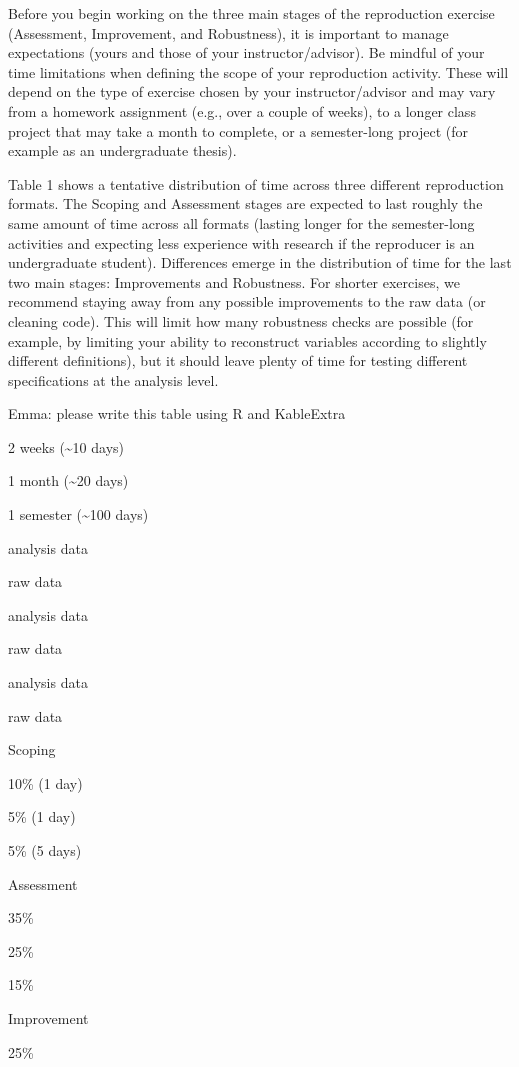 \documentclass[]{book}
\begin{document}
Before you begin working on the three main stages of the reproduction exercise (Assessment, Improvement, and Robustness), it is important to manage expectations (yours and those of your instructor/advisor). Be mindful of your time limitations when defining the scope of your reproduction activity. These will depend on the type of exercise chosen by your instructor/advisor and may vary from a homework assignment (e.g., over a couple of weeks), to a longer class project that may take a month to complete, or a semester-long project (for example as an undergraduate thesis).

Table 1 shows a tentative distribution of time across three different reproduction formats. The Scoping and Assessment stages are expected to last roughly the same amount of time across all formats (lasting longer for the semester-long activities and expecting less experience with research if the reproducer is an undergraduate student). Differences emerge in the distribution of time for the last two main stages: Improvements and Robustness. For shorter exercises, we recommend staying away from any possible improvements to the raw data (or cleaning code). This will limit how many robustness checks are possible (for example, by limiting your ability to reconstruct variables according to slightly different definitions), but it should leave plenty of time for testing different specifications at the analysis level.

Emma: please write this table using R and KableExtra

2 weeks (\textasciitilde{}10 days)

1 month (\textasciitilde{}20 days)

1 semester (\textasciitilde{}100 days)

analysis data

raw data

analysis data

raw data

analysis data

raw data

Scoping

10\% (1 day)

5\% (1 day)

5\% (5 days)

Assessment

35\%

25\%

15\%

Improvement

25\%
\end{document}
